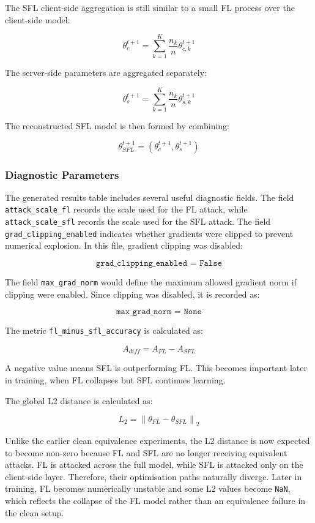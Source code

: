 The SFL client-side aggregation is still similar to a small FL process over the client-side model:

\[
\theta_c^{t+1}
=
\sum_{k=1}^{K}
\frac{n_k}{n}
\theta_{c,k}^{t+1}
\]

The server-side parameters are aggregated separately:

\[
\theta_s^{t+1}
=
\sum_{k=1}^{K}
\frac{n_k}{n}
\theta_{s,k}^{t+1}
\]

The reconstructed SFL model is then formed by combining:

\[
\theta_{SFL}^{t+1}
=
(\theta_c^{t+1}, \theta_s^{t+1})
\]

\subsubsection*{Diagnostic Parameters}

The generated results table includes several useful diagnostic fields. The field \texttt{attack\_scale\_fl} records the scale used for the FL attack, while \texttt{attack\_scale\_sfl} records the scale used for the SFL attack. The field \texttt{grad\_clipping\_enabled} indicates whether gradients were clipped to prevent numerical explosion. In this file, gradient clipping was disabled:

\[
\texttt{grad\_clipping\_enabled = False}
\]

The field \texttt{max\_grad\_norm} would define the maximum allowed gradient norm if clipping were enabled. Since clipping was disabled, it is recorded as:

\[
\texttt{max\_grad\_norm = None}
\]

The metric \texttt{fl\_minus\_sfl\_accuracy} is calculated as:

\[
A_{diff}
=
A_{FL}
-
A_{SFL}
\]

A negative value means SFL is outperforming FL. This becomes important later in training, when FL collapses but SFL continues learning.

The global L2 distance is calculated as:

\[
L_2
=
\left\|
\theta_{FL}
-
\theta_{SFL}
\right\|_2
\]

Unlike the earlier clean equivalence experiments, the L2 distance is now expected to become non-zero because FL and SFL are no longer receiving equivalent attacks. FL is attacked across the full model, while SFL is attacked only on the client-side layer. Therefore, their optimisation paths naturally diverge. Later in training, FL becomes numerically unstable and some L2 values become \texttt{NaN}, which reflects the collapse of the FL model rather than an equivalence failure in the clean setup.


